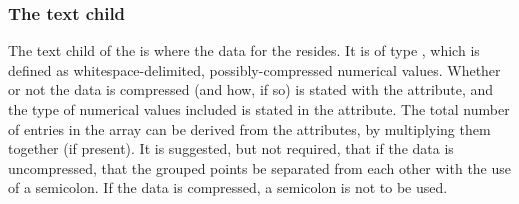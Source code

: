 \subsubsection{The \fixttspace{} text child}
The  text child of the \SampledField is where the data for the \SampledField resides.  It is of type , which is defined as whitespace-delimited, possibly-compressed numerical values.  Whether or not the data is compressed (and how, if so) is stated with the  attribute, and the type of numerical values included is stated in the  attribute.  The total number of entries in the array can be derived from the  attributes, by multiplying them together (if present).  It is suggested, but not required, that if the data is uncompressed, that the grouped points be separated from each other with the use of a semicolon.  If the data is compressed, a semicolon is not to be used.

